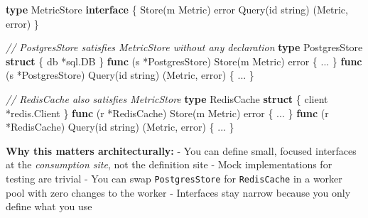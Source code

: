 \documentclass[
]{article}
\newenvironment{Shaded}{}{}
\newcommand{\CommentTok}[1]{\textcolor[rgb]{0.38,0.63,0.69}{\textit{#1}}}
\newcommand{\DataTypeTok}[1]{\textcolor[rgb]{0.56,0.13,0.00}{#1}}
\newcommand{\KeywordTok}[1]{\textcolor[rgb]{0.00,0.44,0.13}{\textbf{#1}}}
\newcommand{\NormalTok}[1]{#1}
\newcommand{\OperatorTok}[1]{\textcolor[rgb]{0.40,0.40,0.40}{#1}}
\begin{document}
\begin{Shaded}
\begin{Highlighting}[]
\KeywordTok{type}\NormalTok{ MetricStore }\KeywordTok{interface} \OperatorTok{\{}
\NormalTok{    Store}\OperatorTok{(}\NormalTok{m Metric}\OperatorTok{)} \DataTypeTok{error}
\NormalTok{    Query}\OperatorTok{(}\NormalTok{id }\DataTypeTok{string}\OperatorTok{)} \OperatorTok{(}\NormalTok{Metric}\OperatorTok{,} \DataTypeTok{error}\OperatorTok{)}
\OperatorTok{\}}

\CommentTok{// PostgresStore satisfies MetricStore without any declaration}
\KeywordTok{type}\NormalTok{ PostgresStore }\KeywordTok{struct} \OperatorTok{\{}\NormalTok{ db }\OperatorTok{*}\NormalTok{sql}\OperatorTok{.}\NormalTok{DB }\OperatorTok{\}}
\KeywordTok{func} \OperatorTok{(}\NormalTok{s }\OperatorTok{*}\NormalTok{PostgresStore}\OperatorTok{)}\NormalTok{ Store}\OperatorTok{(}\NormalTok{m Metric}\OperatorTok{)} \DataTypeTok{error}  \OperatorTok{\{} \OperatorTok{...} \OperatorTok{\}}
\KeywordTok{func} \OperatorTok{(}\NormalTok{s }\OperatorTok{*}\NormalTok{PostgresStore}\OperatorTok{)}\NormalTok{ Query}\OperatorTok{(}\NormalTok{id }\DataTypeTok{string}\OperatorTok{)} \OperatorTok{(}\NormalTok{Metric}\OperatorTok{,} \DataTypeTok{error}\OperatorTok{)} \OperatorTok{\{} \OperatorTok{...} \OperatorTok{\}}

\CommentTok{// RedisCache also satisfies MetricStore}
\KeywordTok{type}\NormalTok{ RedisCache }\KeywordTok{struct} \OperatorTok{\{}\NormalTok{ client }\OperatorTok{*}\NormalTok{redis}\OperatorTok{.}\NormalTok{Client }\OperatorTok{\}}
\KeywordTok{func} \OperatorTok{(}\NormalTok{r }\OperatorTok{*}\NormalTok{RedisCache}\OperatorTok{)}\NormalTok{ Store}\OperatorTok{(}\NormalTok{m Metric}\OperatorTok{)} \DataTypeTok{error}  \OperatorTok{\{} \OperatorTok{...} \OperatorTok{\}}
\KeywordTok{func} \OperatorTok{(}\NormalTok{r }\OperatorTok{*}\NormalTok{RedisCache}\OperatorTok{)}\NormalTok{ Query}\OperatorTok{(}\NormalTok{id }\DataTypeTok{string}\OperatorTok{)} \OperatorTok{(}\NormalTok{Metric}\OperatorTok{,} \DataTypeTok{error}\OperatorTok{)} \OperatorTok{\{} \OperatorTok{...} \OperatorTok{\}}
\end{Highlighting}
\end{Shaded}

\textbf{Why this matters architecturally:} - You can define small,
focused interfaces at the \emph{consumption site}, not the definition
site - Mock implementations for testing are trivial - You can swap
\texttt{PostgresStore} for \texttt{RedisCache} in a worker pool with
zero changes to the worker - Interfaces stay narrow because you only
define what you use
\end{document}
